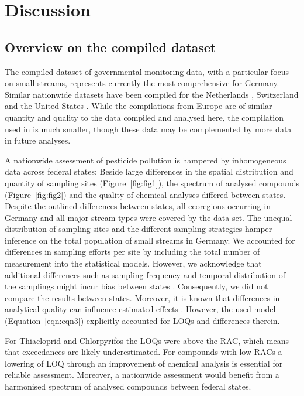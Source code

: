 \documentclass[journal=esthag,manuscript=article]{achemso}
\begin{document}
\section{Discussion}
\subsection{Overview on the compiled dataset}
The compiled dataset of governmental monitoring data, with a particular focus on small streams, represents currently the most comprehensive for Germany.
Similar nationwide datasets have been compiled for the Netherlands \citep{vijver_spatial_2008}, Switzerland \citep{munz_pestizidmessungen_2011} and the United States \citep{stone2014pesticides}.
While the compilations from Europe are of similar quantity and quality to the  data compiled and analysed here, the compilation used in \citet{stone2014pesticides} is much smaller, though these data may be complemented by more data in future analyses. 

A nationwide assessment of pesticide pollution is hampered by inhomogeneous data across federal states:
Beside large differences in the spatial distribution and quantity of sampling sites (Figure~\ref{fig:fig1}), the spectrum of analysed compounds (Figure~\ref{fig:fig2}) and the quality of chemical analyses differed between states. 
Despite the outlined differences between states, all ecoregions occurring in Germany \citep{illies1978limnofauna,abell2008freshwater} and all major stream types were covered by the data set.
The unequal distribution of sampling sites and the different sampling strategies hamper inference on the total population of small streams in Germany.
We accounted for differences in sampling efforts per site by including the total number of measurement into the statistical models. 
However, we acknowledge that additional differences such as sampling frequency and temporal distribution of the samplings might incur bias between states  \citep{stehle_probabilistic_2013,Xing_Chow_Rees_Meng_Li_Ernst_Benoy_Zha_Hewitt_2013}. 
Consequently, we did not compare the results between states.
Moreover, it is known that differences in analytical quality can influence estimated effects \citep{Martin_Eberle_Nakagaki, Schreiner_Szocs_Bhowmik_Vijver_Schafer_2016}.
However, the used model (Equation~\ref{eqn:eqn3}) explicitly accounted for LOQs and differences therein. 

For Thiacloprid and Chlorpyrifos the LOQs were above the RAC, which means that exceedances are likely underestimated.
For compounds with low RACs a lowering of LOQ through an improvement of chemical analysis is essential for reliable assessment.
Moreover, a nationwide assessment would benefit from a harmonised spectrum of analysed compounds between federal states. 
\end{document}
